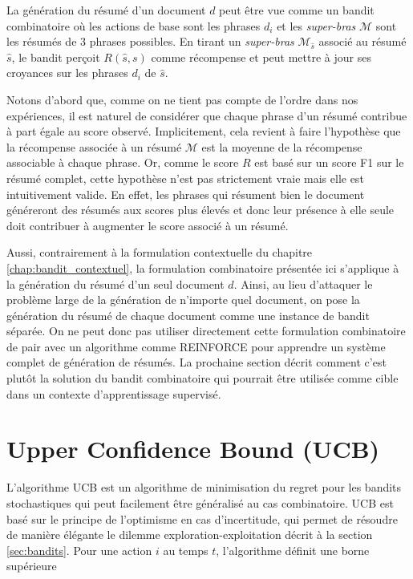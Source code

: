 La génération du résumé d'un document $d$ peut être vue comme un bandit combinatoire où
les actions de base sont les phrases $d_i$ et les \textit{super-bras} $\mathcal{M}$
sont les résumés de 3 phrases possibles.
En tirant un \textit{super-bras} $\mathcal{M}_{\hat{s}}$ associé au résumé $\hat{s}$,
le bandit perçoit $R(\hat{s}, s)$ comme récompense et peut mettre à jour ses
croyances sur les phrases $d_i$ de $\hat{s}$.

Notons d'abord que, comme on ne tient pas compte de l'ordre dans nos expériences,
il est naturel de considérer que chaque phrase d'un résumé contribue à part égale
au score observé.
Implicitement, cela revient à faire l'hypothèse que la récompense associée à un résumé
$\mathcal{M}$ est la moyenne de la récompense associable à chaque phrase.
Or, comme le score $R$ est basé sur un score F1 sur le résumé complet, cette hypothèse
n'est pas strictement vraie mais elle est intuitivement valide.
En effet, les phrases qui résument bien le document généreront des résumés aux scores
plus élevés et donc leur présence à elle seule doit contribuer à augmenter le score
associé à un résumé.

Aussi, contrairement à la formulation contextuelle du chapitre \ref{chap:bandit_contextuel},
la formulation combinatoire présentée ici s'applique à la génération du résumé d'un seul document $d$.
Ainsi, au lieu d'attaquer le problème large de la génération de n'importe quel document,
on pose la génération du résumé de chaque document comme une instance de bandit séparée.
On ne peut donc pas utiliser directement cette formulation combinatoire de pair avec
un algorithme comme REINFORCE pour apprendre un système complet de génération de résumés.
La prochaine section décrit comment c'est plutôt la solution du bandit combinatoire
qui pourrait être utilisée comme cible dans un contexte d'apprentissage supervisé.

\section{Upper Confidence Bound (UCB)}

L'algorithme UCB \citep{ucb} est un algorithme de minimisation du regret pour les
bandits stochastiques qui peut facilement être généralisé au cas combinatoire.
UCB est basé sur le principe de l'optimisme en cas d'incertitude, qui permet de
résoudre de manière élégante le dilemme exploration-exploitation décrit à la section \ref{sec:bandits}.
Pour une action $i$ au temps $t$, l'algorithme définit une borne supérieure

